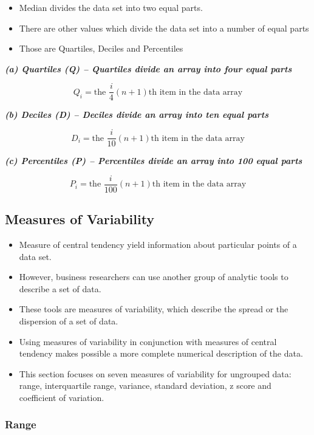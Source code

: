 \documentclass[]{book}
\providecommand{\tightlist}{%
  \setlength{\itemsep}{0pt}\setlength{\parskip}{0pt}}
\begin{document}
\begin{itemize}
\tightlist
\item
  Median divides the data set into two equal parts.
\item
  There are other values which divide the data set into a number of equal parts
\item
  Those are Quartiles, Deciles and Percentiles
\end{itemize}

\textbf{\emph{(a) Quartiles (Q) -- Quartiles divide an array into four equal parts}}

\[Q_i = \text{the }\frac{i}{4}(n+1)\text{th item in the data array} \]

\textbf{\emph{(b) Deciles (D) -- Deciles divide an array into ten equal parts}}

\[D_i = \text{the }\frac{i}{10}(n+1)\text{th item in the data array} \]

\textbf{\emph{(c) Percentiles (P) -- Percentiles divide an array into 100 equal parts}}

\[P_i = \text{the }\frac{i}{100}(n+1)\text{th item in the data array} \]

\hypertarget{measures-of-variability}{%
\subsection{Measures of Variability}\label{measures-of-variability}}

\begin{itemize}
\item
  Measure of central tendency yield information about particular points of a data set.
\item
  However, business researchers can use another group of analytic tools to describe a set of data.
\item
  These tools are measures of variability, which describe the spread or the dispersion of a set of data.
\item
  Using measures of variability in conjunction with measures of central tendency makes possible a more complete numerical description of the data.
\item
  This section focuses on seven measures of variability for ungrouped data: range, interquartile range, variance, standard deviation, z score and coefficient of variation.
\end{itemize}

\hypertarget{range}{%
\subsubsection{Range}\label{range}}
\end{document}
